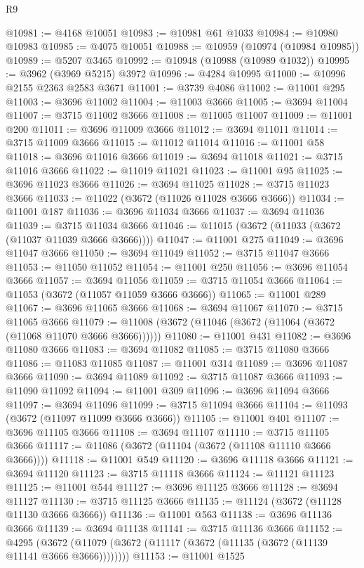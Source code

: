 \begin{lexlean}{R9}
\begin{coremodule}
@10981 := @4168 @10051
@10983 := @10981 @61 @1033
@10984 := @10980 @10983
@10985 := @4075 @10051
@10988 := @10959 (@10974 (@10984 @10985))
@10989 := @5207 @3465
@10992 := @10948 (@10988 (@10989 @1032))
@10995 := @3962 (@3969 @5215) @3972
@10996 := @4284 @10995
@11000 := @10996 @2155 @2363 @2583 @3671
@11001 := @3739 @4086
@11002 := @11001 @295
@11003 := @3696 @11002
@11004 := @11003 @3666
@11005 := @3694 @11004
@11007 := @3715 @11002 @3666
@11008 := @11005 @11007
@11009 := @11001 @200
@11011 := @3696 @11009 @3666
@11012 := @3694 @11011
@11014 := @3715 @11009 @3666
@11015 := @11012 @11014
@11016 := @11001 @58
@11018 := @3696 @11016 @3666
@11019 := @3694 @11018
@11021 := @3715 @11016 @3666
@11022 := @11019 @11021
@11023 := @11001 @95
@11025 := @3696 @11023 @3666
@11026 := @3694 @11025
@11028 := @3715 @11023 @3666
@11033 := @11022 (@3672 (@11026 @11028 @3666 @3666))
@11034 := @11001 @187
@11036 := @3696 @11034 @3666
@11037 := @3694 @11036
@11039 := @3715 @11034 @3666
@11046 := @11015 (@3672 (@11033 (@3672 (@11037 @11039 @3666 @3666))))
@11047 := @11001 @275
@11049 := @3696 @11047 @3666
@11050 := @3694 @11049
@11052 := @3715 @11047 @3666
@11053 := @11050 @11052
@11054 := @11001 @250
@11056 := @3696 @11054 @3666
@11057 := @3694 @11056
@11059 := @3715 @11054 @3666
@11064 := @11053 (@3672 (@11057 @11059 @3666 @3666))
@11065 := @11001 @289
@11067 := @3696 @11065 @3666
@11068 := @3694 @11067
@11070 := @3715 @11065 @3666
@11079 := @11008 (@3672 (@11046 (@3672 (@11064 (@3672 (@11068 @11070 @3666 @3666))))))
@11080 := @11001 @431
@11082 := @3696 @11080 @3666
@11083 := @3694 @11082
@11085 := @3715 @11080 @3666
@11086 := @11083 @11085
@11087 := @11001 @314
@11089 := @3696 @11087 @3666
@11090 := @3694 @11089
@11092 := @3715 @11087 @3666
@11093 := @11090 @11092
@11094 := @11001 @309
@11096 := @3696 @11094 @3666
@11097 := @3694 @11096
@11099 := @3715 @11094 @3666
@11104 := @11093 (@3672 (@11097 @11099 @3666 @3666))
@11105 := @11001 @401
@11107 := @3696 @11105 @3666
@11108 := @3694 @11107
@11110 := @3715 @11105 @3666
@11117 := @11086 (@3672 (@11104 (@3672 (@11108 @11110 @3666 @3666))))
@11118 := @11001 @549
@11120 := @3696 @11118 @3666
@11121 := @3694 @11120
@11123 := @3715 @11118 @3666
@11124 := @11121 @11123
@11125 := @11001 @544
@11127 := @3696 @11125 @3666
@11128 := @3694 @11127
@11130 := @3715 @11125 @3666
@11135 := @11124 (@3672 (@11128 @11130 @3666 @3666))
@11136 := @11001 @563
@11138 := @3696 @11136 @3666
@11139 := @3694 @11138
@11141 := @3715 @11136 @3666
@11152 := @4295
    (@3672 (@11079 (@3672 (@11117 (@3672 (@11135 (@3672 (@11139 @11141 @3666 @3666))))))))
@11153 := @11001 @1525

\end{coremodule}
\end{lexlean}
